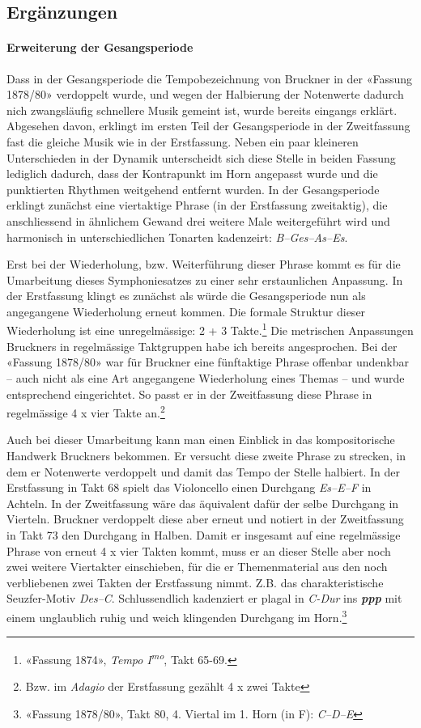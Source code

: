 \subsection{Ergänzungen}

\paragraph{Erweiterung der Gesangsperiode}

Dass in der Gesangsperiode die Tempobezeichnung von Bruckner in der «Fassung 1878/80» verdoppelt wurde, und wegen der Halbierung der Notenwerte dadurch nich zwangsläufig schnellere Musik gemeint ist, wurde bereits eingangs erklärt.
Abgesehen davon, erklingt im ersten Teil der Gesangsperiode in der Zweitfassung fast die gleiche Musik wie in der Erstfassung.
Neben ein paar kleineren Unterschieden in der Dynamik unterscheidt sich diese Stelle in beiden Fassung lediglich dadurch, dass der Kontrapunkt im Horn angepasst wurde und die punktierten Rhythmen weitgehend entfernt wurden.
In der Gesangsperiode erklingt zunächst eine viertaktige Phrase (in der Erstfassung zweitaktig), die anschliessend in ähnlichem Gewand drei weitere Male weitergeführt wird und harmonisch in unterschiedlichen Tonarten kadenzeirt: \emph{B--Ges--As--Es}.

Erst bei der Wiederholung, bzw. Weiterführung dieser Phrase kommt es für die Umarbeitung dieses Symphoniesatzes zu einer sehr erstaunlichen Anpassung.
In der Erstfassung klingt es zunächst als würde die Gesangsperiode nun als angegangene Wiederholung erneut kommen.
Die formale Struktur dieser Wiederholung ist eine unregelmässige: 2 + 3 Takte.\footnote{«Fassung 1874», \emph{Tempo I\textsuperscript{mo}}, Takt 65-69.}
Die metrischen Anpassungen Bruckners in regelmässige Taktgruppen habe ich bereits angesprochen.
Bei der «Fassung 1878/80» war für Bruckner eine fünftaktige Phrase offenbar undenkbar – auch nicht als eine Art angegangene Wiederholung eines Themas – und wurde entsprechend eingerichtet.
So passt er in der Zweitfassung diese Phrase in regelmässige 4 x vier Takte an.\footnote{Bzw. im \emph{Adagio} der Erstfassung gezählt 4 x zwei Takte}

Auch bei dieser Umarbeitung kann man einen Einblick in das kompositorische Handwerk Bruckners bekommen.
Er versucht diese zweite Phrase zu strecken, in dem er Notenwerte verdoppelt und damit das Tempo der Stelle halbiert.
In der Erstfassung in Takt 68 spielt das Violoncello einen Durchgang \emph{Es--E--F} in Achteln.
In der Zweitfassung wäre das äquivalent dafür der selbe Durchgang in Vierteln.
Bruckner verdoppelt diese aber erneut und notiert in der Zweitfassung in Takt 73 den Durchgang in Halben.
Damit er insgesamt auf eine regelmässige Phrase von erneut 4 x vier Takten kommt, muss er an dieser Stelle aber noch zwei weitere Viertakter einschieben, für die er Themenmaterial aus den noch verbliebenen zwei Takten der Erstfassung nimmt.
Z.B. das charakteristische Seuzfer-Motiv \emph{Des--C}.
Schlussendlich kadenziert er plagal in \emph{C-Dur} ins \textbf{\emph{ppp}} mit einem unglaublich ruhig und weich klingenden Durchgang im Horn.\footnote{«Fassung 1878/80», Takt 80, 4. Viertal im 1. Horn (in F): \emph{C--D--E}}


